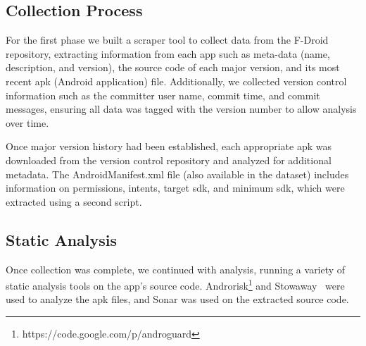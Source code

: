 \documentclass[conference]{IEEEtran}
\begin{document}
\subsection{Collection Process}

For the first phase we built a scraper tool to collect data from the F-Droid repository, extracting information from each app such as meta-data (name, description, and version), the source code of each major version, and its most recent apk (Android application) file.  Additionally, we collected version control information such as the committer user name, commit time, and commit messages, ensuring all data was tagged with the version number to allow analysis over time.


Once major version history had been established, each appropriate apk was downloaded from the version control repository and analyzed for additional metadata.  The AndroidManifest.xml file (also available in the dataset) includes information on permissions, intents, target sdk, and minimum sdk, which were extracted using a second script.



\subsection{Static Analysis}

Once collection was complete, we continued with analysis, running a variety of static analysis tools on the app's source code. Androrisk\footnote{https://code.google.com/p/androguard} and Stowaway~\cite{Felt:2011:APD:2046707.2046779} were used to analyze the apk files, and Sonar was used on the extracted source code.\\
\end{document}
